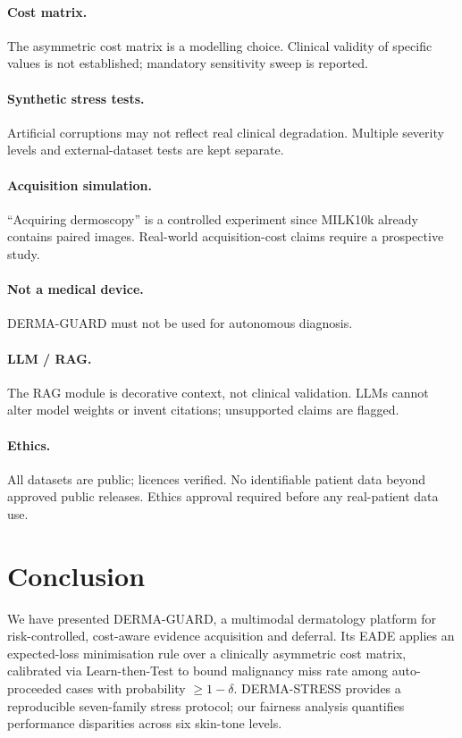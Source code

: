 \documentclass[conference]{IEEEtran}
\newcommand{\1}{\mathbf{1}}
\begin{document}
\paragraph{Cost matrix.}
The asymmetric cost matrix is a modelling choice. Clinical validity of
specific values is not established; mandatory sensitivity sweep is reported.

\paragraph{Synthetic stress tests.}
Artificial corruptions may not reflect real clinical degradation. Multiple
severity levels and external-dataset tests are kept separate.

\paragraph{Acquisition simulation.}
``Acquiring dermoscopy'' is a controlled experiment since MILK10k already
contains paired images. Real-world acquisition-cost claims require a
prospective study.

\paragraph{Not a medical device.}
DERMA-GUARD must not be used for autonomous diagnosis.

\paragraph{LLM / RAG.}
The RAG module is decorative context, not clinical validation. LLMs cannot
alter model weights or invent citations; unsupported claims are flagged.

\paragraph{Ethics.}
All datasets are public; licences verified. No identifiable patient data
beyond approved public releases. Ethics approval required before any
real-patient data use.

\section{Conclusion}
\label{sec:conclusion}

We have presented DERMA-GUARD, a multimodal dermatology platform for
risk-controlled, cost-aware evidence acquisition and deferral. Its EADE
applies an expected-loss minimisation rule over a clinically asymmetric cost
matrix, calibrated via Learn-then-Test to bound malignancy miss rate among
auto-proceeded cases with probability $\geq 1-\delta$. DERMA-STRESS provides
a reproducible seven-family stress protocol; our fairness analysis
quantifies performance disparities across six skin-tone levels.
\end{document}
